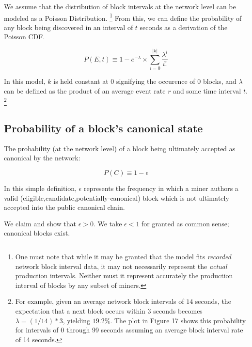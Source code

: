 \documentclass[11pt]{article}
\theoremstyle{plain}
\begin{document}
We assume that the distribution of block intervals at the network level can be
modeled as a Poisson Distribution.\nolinebreak
\footnote{
One must note that while it may be granted that the model fits \emph{recorded}
network block interval data, it may not necessarily represent the \emph{actual}
production intervals. Neither must it represent accurately the production
interval of blocks by any subset of miners.
}
From this, we can define the probability of any block being discovered in an
interval of $t$ seconds as a derivation of the Poisson CDF.

\begin{equation}
P(E,t) \equiv 1 - e^{-\lambda} \times \sum_{i=0}^{|k|}{\frac{\lambda^{i}}{i!}} 
\end{equation}

In this model, $k$ is held constant at $0$ signifying the occurence of 0
blocks, and $\lambda$ can be defined as the product of an average event rate
$r$ and some time interval $t$.\nolinebreak
\footnote{
For example, given an average network block intervals of $14$ seconds, the
expectation that a next block occurs within $3$ seconds becomes $\lambda =
(1/14) * 3$, yielding $19.2\%$.
The plot in Figure 17 shows this probability for intervals of 0 through 99
seconds assuming an average block interval rate of 14 seconds.
}

\subsection{\normalsize{Probability of a block's canonical state}}

The probability (at the network level) of a block being ultimately accepted as
canonical by the network:

\begin{equation}
P(C) \equiv 1 - \epsilon
\end{equation}

In this simple definition, $\epsilon$ represents the frequency in which a miner
authors a valid (eligible,candidate,potentially-canonical) block which is not
ultimately accepted into the public canonical chain.

We claim and show that $\epsilon > 0$. We take $\epsilon < 1$ for granted as
common sense; canonical blocks exist.
\end{document}
